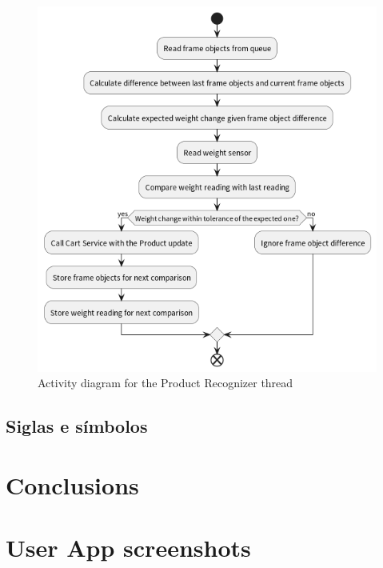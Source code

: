 \documentclass[openright]{normas-utf-tex} %
\begin{document}
\begin{figure}[H]
	\centering
	\includegraphics[width=1\textwidth]{./images/Product Recognizer Activity.png}
	\caption[Activity diagram for the Product Recognizer thread]{Activity diagram for the Product Recognizer thread}
	\label{fig:dummy}
\end{figure}

\section{Siglas e símbolos}


\chapter{Conclusions}


\clearpage %
\label{bibstart}
\label{bibend}

\apendice
\chapter{User App screenshots}
\label{ap:userapp}
\end{document}
